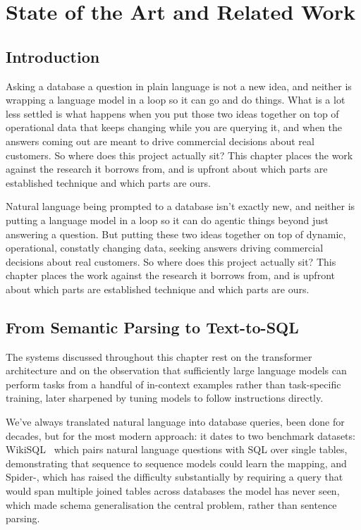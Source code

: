 \chapter{State of the Art and Related Work}\label{ch:related}

\section*{Introduction}

Asking a database a question in plain language is not a new idea, and neither is
wrapping a language model in a loop so it can go and do things. What is a lot
less settled is what happens when you put those two ideas together on top of
operational data that keeps changing while you are querying it, and when the
answers coming out are meant to drive commercial decisions about real customers.
So where does this project actually sit? This chapter places the work against
the research it borrows from, and is upfront about which parts are established
technique and which parts are ours.

Natural language being prompted to a database isn't exactly new, and neither is putting 
a language model in a loop so it can do agentic things beyond just answering a question.
But putting these two ideas together on top of dynamic, operational, constatly changing data,
seeking answers driving commercial decisions about real customers. So where does this project actually sit? This chapter places the work against
the research it borrows from, and is upfront about which parts are established
technique and which parts are ours.
\section{From Semantic Parsing to Text-to-SQL}

The systems discussed throughout this chapter rest on the transformer
architecture\cite{Attention} and on the observation that sufficiently large
language models can perform tasks from a handful of in-context examples rather
than task-specific training\cite{gpt3}, later sharpened by tuning models to
follow instructions directly\cite{instructgpt}.

We've always translated natural language into database queries, been done for decades,
but for the most modern approach: it dates to two benchmark datasets: WikiSQL~\cite{seq2sql}
which pairs natural language questions with SQL over single tables, demonstrating that 
sequence to sequence models could learn the mapping, and Spider-\cite{spider}, which has
raised the difficulty substantially by requiring a query that would span multiple joined tables
across databases the model has never seen, which made schema generalisation the central problem,
rather than sentence parsing.


